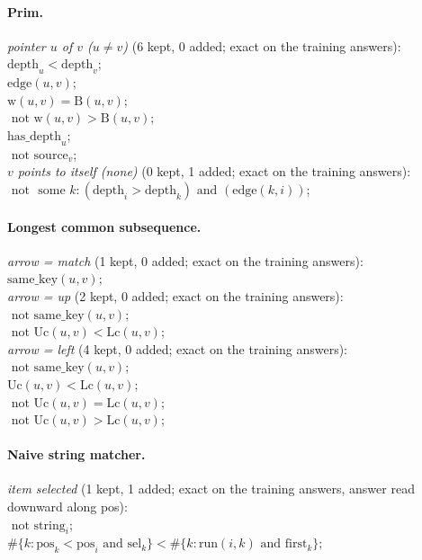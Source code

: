 \documentclass[10pt]{article}
\begin{document}
{\paragraph{Prim.}
\emph{pointer $u$ of $v$ ($u \neq v$)} (6 kept, 0 added; exact on the training answers):\\
\quad $\mathrm{depth}_{u} < \mathrm{depth}_{v}$;\\
\quad $\mathrm{edge}(u, v)$;\\
\quad $\mathrm{w}(u, v) = \mathrm{B}(u, v)$;\\
\quad $\text{ not } \mathrm{w}(u, v) > \mathrm{B}(u, v)$;\\
\quad $\mathrm{has\_depth}_{u}$;\\
\quad $\text{ not } \mathrm{source}_{v}$;\\
\emph{$v$ points to itself (none)} (0 kept, 1 added; exact on the training answers):\\
\quad $\text{ not } \text{ some } k: (\mathrm{depth}_{i} > \mathrm{depth}_{k}) \text{ and } (\mathrm{edge}(k, i))$;

\paragraph{Longest common subsequence.}
\emph{arrow = match} (1 kept, 0 added; exact on the training answers):\\
\quad $\mathrm{same\_key}(u, v)$;\\
\emph{arrow = up} (2 kept, 0 added; exact on the training answers):\\
\quad $\text{ not } \mathrm{same\_key}(u, v)$;\\
\quad $\text{ not } \mathrm{Uc}(u, v) < \mathrm{Lc}(u, v)$;\\
\emph{arrow = left} (4 kept, 0 added; exact on the training answers):\\
\quad $\text{ not } \mathrm{same\_key}(u, v)$;\\
\quad $\mathrm{Uc}(u, v) < \mathrm{Lc}(u, v)$;\\
\quad $\text{ not } \mathrm{Uc}(u, v) = \mathrm{Lc}(u, v)$;\\
\quad $\text{ not } \mathrm{Uc}(u, v) > \mathrm{Lc}(u, v)$;

\paragraph{Naive string matcher.}
\emph{item selected} (1 kept, 1 added; exact on the training answers, answer read downward along pos):\\
\quad $\text{ not } \mathrm{string}_{i}$;\\
\quad $\#\{k: \mathrm{pos}_{k} < \mathrm{pos}_{i} \text{ and } \mathrm{sel}_{k}\} < \#\{k: \mathrm{run}(i, k) \text{ and } \mathrm{first}_{k}\}$;

}
\end{document}
